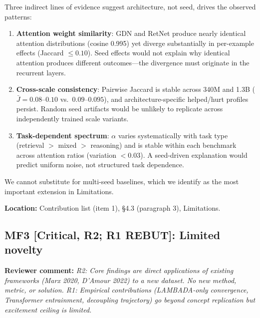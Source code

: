 \documentclass[11pt]{article}
\newcommand{\reviewer}[1]{\textcolor{reviewercolor}{\textbf{Reviewer comment:} \textit{#1}}}
\newcommand{\location}[1]{\textbf{Location:} #1}
\begin{document}
Three indirect lines of evidence suggest architecture, not seed, drives the observed patterns:
\begin{enumerate}[leftmargin=2em]
\item \textbf{Attention weight similarity}: GDN and RetNet produce nearly identical attention distributions (cosine 0.995) yet diverge substantially in per-example effects (Jaccard $\leq 0.10$). Seed effects would not explain why identical attention produces different outcomes---the divergence must originate in the recurrent layers.
\item \textbf{Cross-scale consistency}: Pairwise Jaccard is stable across 340M and 1.3B ($\bar{J} = 0.08$--$0.10$ vs.\ $0.09$--$0.095$), and architecture-specific helped/hurt profiles persist. Random seed artifacts would be unlikely to replicate across independently trained scale variants.
\item \textbf{Task-dependent spectrum}: $\alpha$ varies systematically with task type (retrieval $>$ mixed $>$ reasoning) and is stable within each benchmark across attention ratios (variation $< 0.03$). A seed-driven explanation would predict uniform noise, not structured task dependence.
\end{enumerate}

We cannot substitute for multi-seed baselines, which we identify as the most important extension in Limitations.

\location{Contribution list (item 1), \S4.3 (paragraph 3), Limitations.}

\subsection*{MF3 [Critical, R2; R1 REBUT]: Limited novelty}

\reviewer{R2: Core findings are direct applications of existing frameworks (Marx 2020, D'Amour 2022) to a new dataset. No new method, metric, or solution. R1: Empirical contributions (LAMBADA-only convergence, Transformer entrainment, decoupling trajectory) go beyond concept replication but excitement ceiling is limited.}
\end{document}

